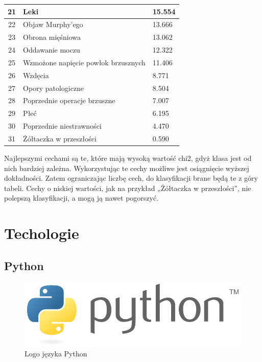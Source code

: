 \begin{longtable}{|c|l|l|}
        \hline 21 & Leki & 15.554 \\
        \hline 22 & Objaw Murphy'ego & 13.666 \\
        \hline 23 & Obrona mięśniowa & 13.062 \\
        \hline 24 & Oddawanie moczu & 12.322 \\
        \hline 25 & Wzmożone napięcie powłok brzusznych & 11.406 \\
        \hline 26 & Wzdęcia & 8.771 \\
        \hline 27 & Opory patologiczne & 8.504 \\
        \hline 28 & Poprzednie operacje brzuszne & 7.007 \\
        \hline 29 & Płeć & 6.195 \\
        \hline 30 & Poprzednie niestrawności & 4.470 \\
        \hline 31 & Żółtaczka w przeszłości & 0.590 \\
    \end{longtable}

    \vspace{1em}

    Najlepszymi cechami są te, które mają wysoką wartość chi2, gdyż klasa jest od nich bardziej zależna.
    Wykorzystując te cechy możliwe jest osiągnięcie wyższej dokładności.
    Zatem ograniczając liczbę cech, do klasyfikacji brane będą te z góry tabeli.
    Cechy o niskiej wartości, jak na przykład „Żółtaczka w przeszłości”, nie polepszą klasyfikacji, a mogą ją nawet pogorszyć.

    \chapter{Techologie}\label{ch:techologie}

    \section{Python}\label{sec:python}

    \begin{figure}[htp]
        \centering
        \includegraphics[scale=0.4]{./img/python-logo.png}
        \caption{Logo języka Python}
    \end{figure}

